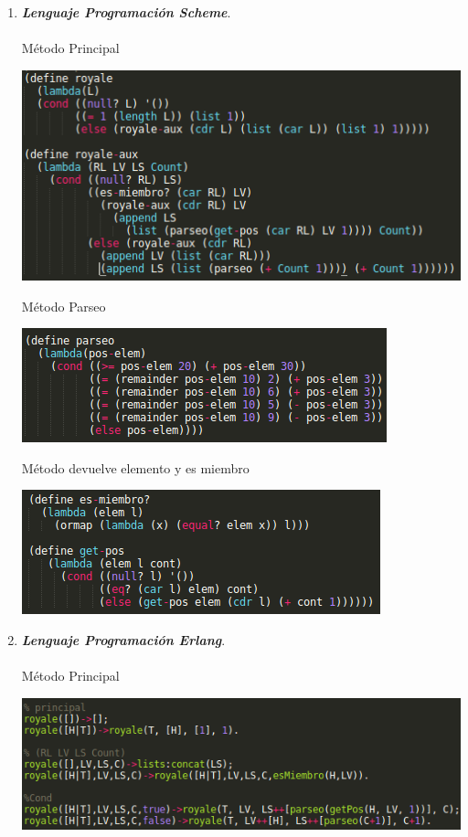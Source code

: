 \documentclass[12pt,a4paper]{article}
\begin{document}
\begin{enumerate}
\item \textbf{\textit{Lenguaje Programaci\'on Scheme}}. \\\\
M\'etodo Principal
\begin{center} 
\includegraphics[scale=0.8]{principalScheme}
\end{center}
	
M\'etodo Parseo
\begin{center} 
\includegraphics[scale=0.8]{parseoScheme}
\end{center}

M\'etodo devuelve elemento y es miembro
\begin{center} 
\includegraphics[scale=0.8]{metodosScheme}
\end{center}

\item \textbf{\textit{Lenguaje Programaci\'on Erlang}}. \\\\
M\'etodo Principal
\begin{center}
\includegraphics[scale=0.8]{principalErlang}
\end{center}


\end{enumerate}
\end{document}
